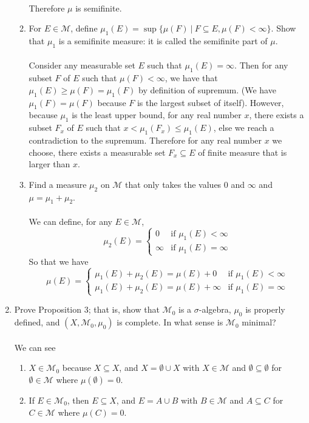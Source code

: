 \begin{enumerate}
\begin{enumerate}[label=(\roman*),align=left]
		\\Therefore $\mu$ is semifinite.
		\item For $E\in\mathcal{M}$, define $\mu_1(E)=\sup\{\mu(F)\ |\ F\subseteq E,\mu(F)<\infty\}$. 
		Show that $\mu_1$ is a semifinite measure: it is called the semifinite part of $\mu$.\\
		\\Consider any measurable set $E$ such that $\mu_1(E)=\infty$.
		Then for any subset $F$ of $E$ such that $\mu(F)<\infty$, we have that $\mu_1(E)\ge\mu(F)=\mu_1(F)$ by definition of supremum.
		(We have $\mu_1(F)=\mu(F)$ because $F$ is the largest subset of itself).
		However, because $\mu_1$ is the least upper bound, for any real number $x$, there exists a subset $F_x$ of $E$ such that $x<\mu_1(F_x)\le\mu_1(E)$, else we reach a contradiction to the supremum.
		Therefore for any real number $x$ we choose, there exists a measurable set $F_x\subseteq E$ of finite measure that is larger than $x$.  
		\item Find a measure $\mu_2$ on $\mathcal{M}$ that only takes the values $0$ and $\infty$ and $\mu=\mu_1+\mu_2$.\\
		\\We can define, for any $E\in\mathcal{M}$, 
		\[
			\mu_2(E)=
			\begin{cases}
				0&\text{if }\mu_1(E)<\infty\\
				\infty&\text{if }\mu_1(E)=\infty
			\end{cases}
		\]
		So that we have
		\[
			\mu(E)=
			\begin{cases}
				\mu_1(E)+\mu_2(E)=\mu(E)+0&\text{if }\mu_1(E)<\infty\\
				\mu_1(E)+\mu_2(E)=\mu(E)+\infty&\text{if }\mu_1(E)=\infty
			\end{cases}
		\]
	\end{enumerate}
	\item Prove Proposition 3; that is, show that $\mathcal{M}_0$ is a $\sigma$-algebra, $\mu_0$ is properly defined, and $(X,\mathcal{M}_0,\mu_0)$ is complete. In what sense is $\mathcal{M}_0$ minimal?\\
	\\We can see
	\begin{enumerate}[label=(\roman*),align=left]
		\item $X\in\mathcal{M}_0$ because $X\subseteq X$, and $X=\emptyset\cup X$ with $X\in\mathcal{M}$ and $\emptyset\subseteq\emptyset$ for $\emptyset\in\mathcal{M}$ where $\mu(\emptyset)=0$.
		\item If $E\in\mathcal{M}_0$, then $E\subseteq X$, and $E=A\cup B$ with $B\in\mathcal{M}$ and $A\subseteq C$ for $C\in\mathcal{M}$ where $\mu(C)=0$.\\

\end{enumerate}
\end{enumerate}
